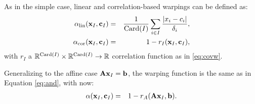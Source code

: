 As in the simple case, linear and correlation-based warpings can be defined as:
\begin{eqnarray}
 \alpha_\text{lin}(\mathbf{x}_I,  \mathbf{c}_I) &=& \frac{1}{\operatorname{Card}(I)} \sum_{i \in I}\frac{\lvert x_i - c_i \rvert}{\delta_i}, \\
  \alpha_\text{cor}(\mathbf{x}_I,  \mathbf{c}_I) &=& 1 - r_I(\mathbf{x}_I, \mathbf{c}_I),
\end{eqnarray}
with $r_I$ a $\mathbb{R}^{\operatorname{Card}(I)} \times \mathbb{R}^{\operatorname{Card}(I)} \rightarrow \mathbb{R}$ correlation function as in \ref{eq:covw}.


Generalizing to the affine case $\mathbf{A} \mathbf{x}_I = \mathbf{b}$, 
% 
the warping function is the same as in Equation \ref{eq:and}, with now:
\begin{eqnarray}
  \alpha(\mathbf{x}_I,  \mathbf{c}_I) &=& 1 - r_A(\mathbf{A} \mathbf{x}_I, \mathbf{b}).\label{eq:aff}
\end{eqnarray}

